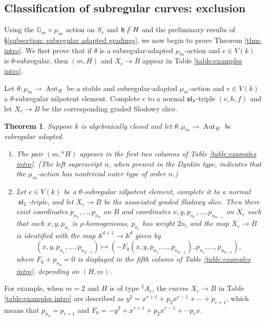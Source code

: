 \documentclass{article} %
\newtheorem{theorem}[proposition]{Theorem}
\numberwithin{equation}{section}
\theoremstyle{definition}
\DeclareMathOperator{\liesl}{\mathfrak{sl}}
\DeclareMathOperator{\Aut}{Aut}
\newcommand{\A}{\mathbb{A}}
\newcommand{\GIT}{\mathbin{/\mkern-6mu/}}
\newcommand{\frakh}{\mathfrak h}
\newcommand{\rl}{r} %
\begin{document}
\subsection{Classification of subregular curves: exclusion}

Using the $\mathbb{G}_m \times \mu_m$ action on $S_e$ and $\frakh\GIT H$ and the preliminary results of \S\ref{subsection: subregular adapted gradings}, we now begin to prove Theorem \ref{thm-intro}. 
We first prove that if $\theta$ is a subregular-adapted $\mu_m$-action and $e\in V(k)$ is $\theta$-subregular, then $(m, H)$ and $X_e\rightarrow B$ appear in Table \ref{table:examples intro}.


Let $\theta\colon \mu_m\rightarrow \Aut_H$ be a stable and subregular-adapted $\mu_m$-action and $e\in V(k)$ a $\theta$-subregular nilpotent element.
Complete $e$ to a normal $\frak{sl}_2$-triple $(e,h,f)$ and let $X_e\rightarrow B$ be the corresponding graded Slodowy slice.



\begin{theorem}\label{theorem: subregular classification: exclusion}
    Suppose $k$ is algebraically closed and let $\theta\colon \mu_m\rightarrow \Aut_H$ be subregular adapted.
    \begin{enumerate}
        \item The pair $(m, {}^nH)$ appears in the first two columns of Table \ref{table:examples intro}.
        (The left superscript $n$, when present in the Dynkin type, indicates that the $\mu_m$-action has nontrivial outer type of order $n$.)
        \item Let $e\in V(k)$ be a $\theta$-subregular nilpotent element, complete it to a normal $\liesl_2$-triple, and let $X_e\rightarrow B$ be the associated graded Slodowy slice.
        Then there exist coordinates $p_{n_1}, \dots, p_{n_d}$ on $B$ and coordinates $x,y,p_{n_1}, \dots, p_{n_{d-1}}$ on $X_e$ such that each $x,y,p_{n_i}$ is $\rho$-homogeneous, $p_{n_i}$ has weight $2n_i$ and the map $X_e \rightarrow B$ is identified with the map $\A^{d+1} \rightarrow \A^d$ given by  
        \[(x,y,p_{n_1}, \dots,p_{n_{d-1}})\mapsto (-F_0(x,y,p_{n_1}, \dots,p_{n_{d-1}}), p_{n_1}, \dots, p_{n_{d-1}}),\]
        where $F_0 + p_{n_d}=0$ is displayed in the fifth column of Table \ref{table:examples intro}, depending on $(H,m)$.
    \end{enumerate}
\end{theorem}



For example, when $m=2$ and $H$ is of type $^2A_\rl$, the curves $X_e\rightarrow B$ in Table \ref{table:examples intro} are described as $y^2 = x^{\rl+1} + p_2 x^{\rl-1} +\cdots + p_{\rl+1}$, which means that $p_{n_d} = p_{\rl+1}$ and $F_0 = -y^2 + x^{\rl+1} + p_2 x^{\rl-1} + \cdots p_{\rl} x$.
\end{document}
